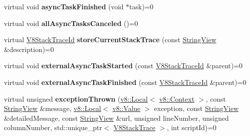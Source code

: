 \begin{DoxyCompactItemize}
virtual void {\bfseries async\+Task\+Finished} (void $\ast$task)=0
\item 
\mbox{\label{classv8__inspector_1_1V8Inspector_a2a92520981e6d348ae004c6c72098975}} 
virtual void {\bfseries all\+Async\+Tasks\+Canceled} ()=0
\item 
\mbox{\label{classv8__inspector_1_1V8Inspector_af9682cd0e499d0d5e628c619b5efc382}} 
virtual \mbox{\hyperlink{structv8__inspector_1_1V8StackTraceId}{V8\+Stack\+Trace\+Id}} {\bfseries store\+Current\+Stack\+Trace} (const \mbox{\hyperlink{classv8__inspector_1_1StringView}{String\+View}} \&description)=0
\item 
\mbox{\label{classv8__inspector_1_1V8Inspector_afd1530d80ad0a5a8bb284fc5aeb32fef}} 
virtual void {\bfseries external\+Async\+Task\+Started} (const \mbox{\hyperlink{structv8__inspector_1_1V8StackTraceId}{V8\+Stack\+Trace\+Id}} \&parent)=0
\item 
\mbox{\label{classv8__inspector_1_1V8Inspector_a0968e8e70a8c9086b66e421e02db8a5e}} 
virtual void {\bfseries external\+Async\+Task\+Finished} (const \mbox{\hyperlink{structv8__inspector_1_1V8StackTraceId}{V8\+Stack\+Trace\+Id}} \&parent)=0
\item 
\mbox{\label{classv8__inspector_1_1V8Inspector_a71e69c7b3fbb5eb9c0b5272f6aab3a2d}} 
virtual unsigned {\bfseries exception\+Thrown} (\mbox{\hyperlink{classv8_1_1Local}{v8\+::\+Local}}$<$ \mbox{\hyperlink{classv8_1_1Context}{v8\+::\+Context}} $>$, const \mbox{\hyperlink{classv8__inspector_1_1StringView}{String\+View}} \&message, \mbox{\hyperlink{classv8_1_1Local}{v8\+::\+Local}}$<$ \mbox{\hyperlink{classv8_1_1Value}{v8\+::\+Value}} $>$ exception, const \mbox{\hyperlink{classv8__inspector_1_1StringView}{String\+View}} \&detailed\+Message, const \mbox{\hyperlink{classv8__inspector_1_1StringView}{String\+View}} \&url, unsigned line\+Number, unsigned column\+Number, std\+::unique\+\_\+ptr$<$ \mbox{\hyperlink{classv8__inspector_1_1V8StackTrace}{V8\+Stack\+Trace}} $>$, int script\+Id)=0
\item 
\mbox{\label{classv8__inspector_1_1V8Inspector_a6853e6b53df0a0058b0e7ff2a3cc94ec}} 

\end{DoxyCompactItemize}
